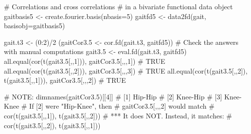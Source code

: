\begin{Examples}
\begin{ExampleCode}
# Correlations and cross correlations
# in a bivariate functional data object
gaitbasis5 <- create.fourier.basis(nbasis=5)
gaitfd5 <- data2fd(gait, basisobj=gaitbasis5)

gait.t3 <- (0:2)/2
(gaitCor3.5 <- cor.fd(gait.t3, gaitfd5))
# Check the answers with manual computations
gait3.5 <- eval.fd(gait.t3, gaitfd5)
all.equal(cor(t(gait3.5[,,1])), gaitCor3.5[,,,1])
# TRUE
all.equal(cor(t(gait3.5[,,2])), gaitCor3.5[,,,3])
# TRUE
all.equal(cor(t(gait3.5[,,2]), t(gait3.5[,,1])),
               gaitCor3.5[,,,2])
# TRUE

# NOTE:
dimnames(gaitCor3.5)[[4]]
# [1] Hip-Hip
# [2] Knee-Hip 
# [3] Knee-Knee
# If [2] were "Hip-Knee", then
# gaitCor3.5[,,,2] would match 
# cor(t(gait3.5[,,1]), t(gait3.5[,,2]))
# *** It does NOT.  Instead, it matches:  
# cor(t(gait3.5[,,2]), t(gait3.5[,,1]))

\end{ExampleCode}
\end{Examples}

